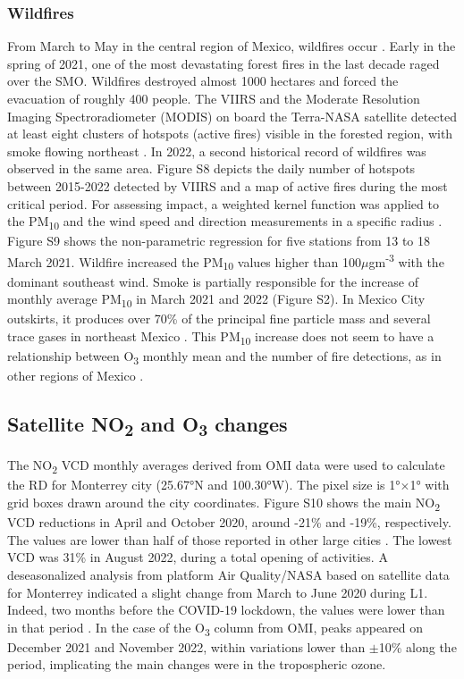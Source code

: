 \documentclass[preprint,12pt]{elsarticle}
\begin{document}
\subsubsection{Wildfires}
\label{sec:wildfiles}
From March to May in the central region of Mexico, wildfires occur \citep{Bravo_2002}. Early in the spring of 2021, one of the most devastating forest fires in the last decade raged over the SMO. Wildfires destroyed almost 1000 hectares and forced the evacuation of roughly 400 people. The VIIRS and the Moderate Resolution Imaging Spectroradiometer (MODIS) on board the Terra-NASA satellite detected at least eight clusters of hotspots (active fires) visible in the forested region, with smoke flowing northeast \citep{web}. In 2022, a second historical record of wildfires was observed in the same area. Figure S8 depicts the daily number of hotspots between 2015-2022 detected by VIIRS and a map of active fires during the most critical period. For assessing impact, a weighted kernel function was applied to the PM\textsubscript{10} and the wind speed and direction measurements in a specific radius \citep{Henry2009,Petit_2017,Ji_2019}. Figure S9 shows the non-parametric regression for five stations from 13 to 18 March 2021. Wildfire increased the PM\textsubscript{10} values higher than 100$\mu$gm\textsuperscript{-3} with the dominant southeast wind. Smoke is partially responsible for the increase of monthly average PM\textsubscript{10} in March 2021 and 2022 (Figure S2). In Mexico City outskirts, it produces over 70\% of the principal fine particle mass \citep{Yokelson_2007} and several trace gases in northeast Mexico \citep{Mendoza_2005}. This PM\textsubscript{10} increase does not seem to have a relationship between O\textsubscript{3} monthly mean and the number of fire detections, as in other regions of Mexico \citep{Carbajal_2015}.
\subsection{Satellite NO\textsubscript{2} and O\textsubscript{3} changes}
The NO\textsubscript{2} VCD monthly averages derived from OMI data \citep{Lamsal_2020} were used to calculate the RD for Monterrey city (25.67°N and 100.30°W). The pixel size is 1°$\times$1° with grid boxes drawn around the city coordinates. Figure S10 shows the main NO\textsubscript{2} VCD reductions in April and October 2020, around -21\% and -19\%, respectively. The values are lower than half of those reported in other large cities \citep{Bauwens2020}. The lowest VCD was 31\% in August 2022, during a total opening of activities. A deseasonalized analysis from platform Air Quality/NASA based on satellite data for Monterrey indicated a slight change from March to June 2020 during L1. Indeed, two months before the COVID-19 lockdown, the values were lower than in that period \citep{quality}. In the case of the O\textsubscript{3} column from OMI, peaks appeared on December 2021 and November 2022, within variations lower than \(\pm\)10\% along the period, implicating the main changes were in the tropospheric ozone.
\end{document}
